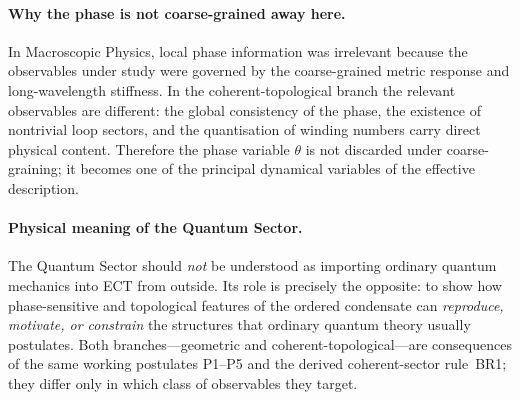 \documentclass[11pt,a4paper]{article}
\numberwithin{equation}{section}
\begin{document}
\paragraph{Why the phase is not coarse-grained away here.}
In Macroscopic Physics, local phase information was irrelevant
because the observables under study were governed by the coarse-grained
metric response and long-wavelength stiffness.
In the coherent-topological branch the relevant observables are
different: the global consistency of the phase, the existence of
nontrivial loop sectors, and the quantisation of winding numbers
carry direct physical content.
Therefore the phase variable $\theta$ is not discarded under
coarse-graining; it becomes one of the principal dynamical variables
of the effective description.

\paragraph{Physical meaning of the Quantum Sector.}
The Quantum Sector should \emph{not} be understood as importing
ordinary quantum mechanics into ECT from outside.
Its role is precisely the opposite: to show how phase-sensitive and
topological features of the ordered condensate can \emph{reproduce,
motivate, or constrain} the structures that ordinary quantum theory
usually postulates.
Both branches---geometric and coherent-topological---are consequences
of the same working postulates P1--P5 and the derived coherent-sector
rule~BR1; they differ only in which class of observables they target.
\end{document}
